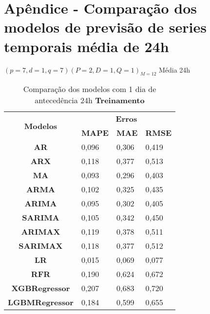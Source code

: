 
\section{Ap\^endice - Compara\c c\~ao dos modelos de previs\~ao de series temporais m\'edia de 24h}\label{sec:comtb24}



$(p = 7,d = 1,q = 7) (P = 2,D = 1,Q = 1)_{M = 12}$ Média 24h
	\begin{table}[H]
	\centering
	\caption{Comparação dos modelos com 1 dia de antecedência 24h \textbf{Treinamento} }\label{tb:1-24trn}
	\begin{tabular}{@{}clll@{}}
		\toprule
		\multirow{2}{*}{\textbf{Modelos}} & \multicolumn{3}{c}{\textbf{Erros}}                                                                       \\ \cmidrule(l){2-4} 
		& \multicolumn{1}{c}{\textbf{MAPE}} & \multicolumn{1}{c}{\textbf{MAE}} & \multicolumn{1}{c}{\textbf{RMSE}} \\ \hline
\textbf{AR}                       & 0,096                             & 0,306                            & 0,419                             \\
\textbf{ARX}                      & 0,118                             & 0,377                            & 0,513                             \\
\textbf{MA}                       & 0,093                             & 0,296                            & 0,403                             \\
\textbf{ARMA}                     & 0,102                             & 0,325                            & 0,435                             \\
\textbf{ARIMA}                    & 0,095                             & 0,302                            & 0,405                             \\
\textbf{SARIMA}                   & 0,105                             & 0,342                            & 0,450                             \\
\textbf{ARIMAX}                   & 0,119                             & 0,378                            & 0,511                             \\
\textbf{SARIMAX}                  & 0,118                             & 0,377                            & 0,512                             \\
\textbf{LR}                       & 0,015                             & 0,069                            & 0,077                             \\
\textbf{RFR}                      & 0,190                             & 0,624                            & 0,672                             \\
\textbf{XGBRegressor}             & 0,207                             & 0,683                            & 0,720                             \\
\textbf{LGBMRegressor}            & 0,184                             & 0,599                            & 0,655                             \\ \bottomrule
	\end{tabular}


\end{table}
